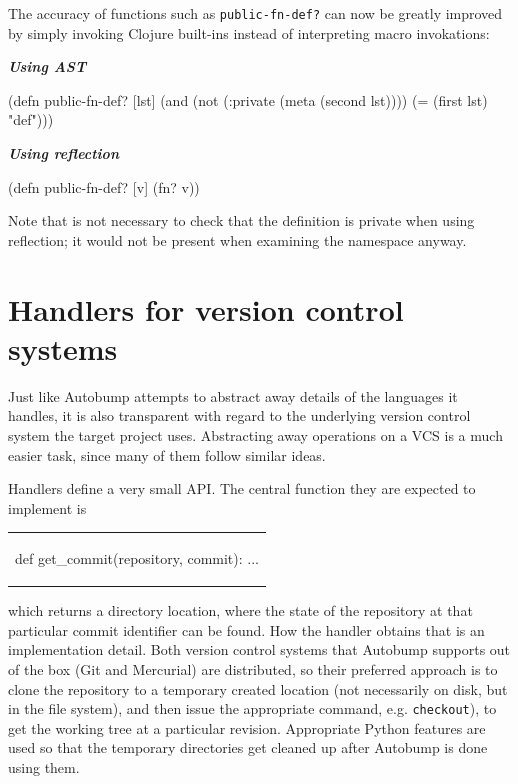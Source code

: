 \documentclass{l4proj}
\newenvironment{halfmini}[1]
{
\begin{minipage}[t]{0.5\textwidth}
\noindent\textbf{\textit{#1}}\\
}
{
\end{minipage}
}
\newcommand\genericstyle{\lstset{basicstyle=\ttm}}
\newcommand\codeinline[1]{{\genericstyle\lstinline!#1!}}
\begin{document}
The accuracy of functions such as \codeinline{public-fn-def?} can now
be greatly improved by simply invoking Clojure built-ins instead of
interpreting macro invokations:

\begin{halfmini}{Using AST}
\begin{clojure}
(defn public-fn-def? [lst]
  (and
    (not (:private (meta (second lst))))
    (= (first lst) "def")))
\end{clojure}
\end{halfmini}
\begin{halfmini}{Using reflection}
\begin{clojure}
(defn public-fn-def? [v]
  (fn? v))
\end{clojure}
\end{halfmini}

Note that is not necessary to check that the definition is private
when using reflection; it would not be present when examining the
namespace anyway.

\section{Handlers for version control systems}
\label{VCSHandlers}

Just like Autobump attempts to abstract away details of the languages
it handles, it is also transparent with regard to the underlying
version control system the target project uses. Abstracting away
operations on a VCS is a much easier task, since many of them follow
similar ideas.

Handlers define a very small API. The central function they are
expected to implement is

\begin{center}
\begin{tabular}{c}
\begin{python}
def get_commit(repository, commit):
    ...
\end{python}
\end{tabular}
\end{center}

which returns a directory location, where the state of the repository
at that particular commit identifier can be found. How the handler
obtains that is an implementation detail. Both version control systems
that Autobump supports out of the box (Git and Mercurial) are
distributed, so their preferred approach is to clone the repository to
a temporary created location (not necessarily on disk, but in the file
system), and then issue the appropriate command, e.g.
\codeinline{checkout}), to get the working tree at a particular
revision. Appropriate Python features are used so that the temporary
directories get cleaned up after Autobump is done using them.
\end{document}
